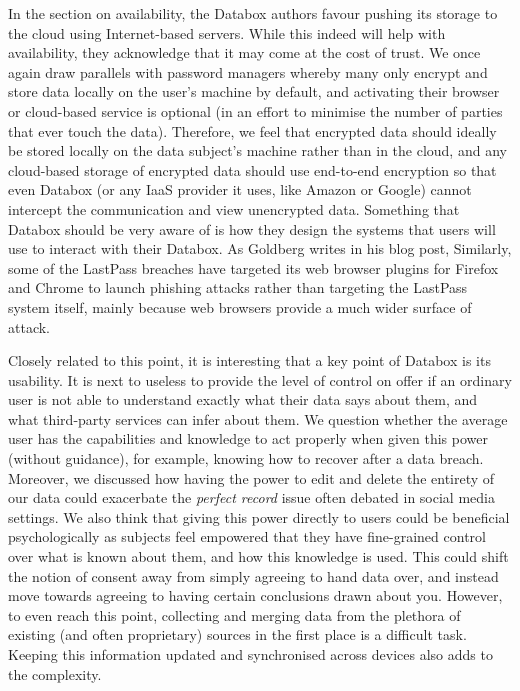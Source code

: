 \documentclass[format=acmsmall, review=false, screen=true]{acmart}
\begin{document}
In the section on availability, the Databox authors favour pushing its storage to the cloud using Internet-based servers. While this indeed will help with availability, they acknowledge that it may come at the cost of trust. We once again draw parallels with password managers whereby many only encrypt and store data locally on the user’s machine by default, and activating their browser or cloud-based service is optional (in an effort to minimise the number of parties that ever touch the data). Therefore, we feel that encrypted data should ideally be stored locally on the data subject’s machine rather than in the cloud, and any cloud-based storage of encrypted data should use end-to-end encryption so that even Databox (or any IaaS provider it uses, like Amazon or Google) cannot intercept the communication and view unencrypted data.
Something that Databox should be very aware of is how they design the systems that users will use to interact with their Databox. As Goldberg writes in his blog post,  Similarly, some of the LastPass breaches have targeted its web browser plugins for Firefox and Chrome to launch phishing attacks rather than targeting the LastPass system itself, mainly because web browsers provide a much wider surface of attack.

Closely related to this point, it is interesting that a key point of Databox is its usability. It is next to useless to provide the level of control on offer if an ordinary user is not able to understand exactly what their data says about them, and what third-party services can infer about them. We question whether the average user has the capabilities and knowledge to act properly when given this power (without guidance), for example, knowing how to recover after a data breach. Moreover, we discussed how having the power to edit and delete the entirety of our data could exacerbate the \textit{perfect record} issue often debated in social media settings.
We also think that giving this power directly to users could be beneficial psychologically as subjects feel empowered that they have fine-grained control over what is known about them, and how this knowledge is used. This could shift the notion of consent away from simply agreeing to hand data over, and instead move towards agreeing to having certain conclusions drawn about you. However, to even reach this point, collecting and merging data from the plethora of existing (and often proprietary) sources in the first place is a difficult task. Keeping this information updated and synchronised across devices also adds to the complexity.
\end{document}
